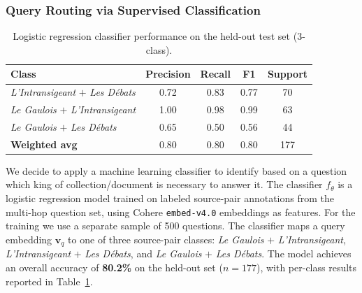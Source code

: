 \subsubsection{Query Routing via Supervised Classification}
\label{sec:classifier}

\begin{table}[htbp]
\centering
\small
\begin{tabular}{lcccc}
\toprule
\textbf{Class} & \textbf{Precision} & \textbf{Recall} & \textbf{F1} & \textbf{Support} \\
\midrule
\textit{L'Intransigeant} $+$ \textit{Les Débats}  & 0.72 & 0.83 & 0.77 & 70 \\
\textit{Le Gaulois} $+$ \textit{L'Intransigeant}  & 1.00 & 0.98 & 0.99 & 63 \\
\textit{Le Gaulois} $+$ \textit{Les Débats}        & 0.65 & 0.50 & 0.56 & 44 \\
\midrule
\textbf{Weighted avg}                              & 0.80 & 0.80 & 0.80 & 177 \\
\bottomrule
\end{tabular}
\caption{Logistic regression classifier performance on the held-out test set (3-class).}
\label{tab:clf-report}
\end{table}

We decide to apply a machine learning classifier to identify based on a question which king of collection/document is necessary to answer it.
The classifier $f_\theta$ is a logistic regression model trained on labeled
source-pair annotations from the multi-hop question set, using Cohere
\texttt{embed-v4.0} embeddings as features. For the training we use a separate sample of 500 questions. The classifier maps a query embedding $\mathbf{v}_q$ to one of three source-pair classes:
\textit{Le Gaulois} $+$ \textit{L'Intransigeant},
\textit{L'Intransigeant} $+$ \textit{Les Débats}, and
\textit{Le Gaulois} $+$ \textit{Les Débats}.
The model achieves an overall accuracy of \textbf{80.2\%} on the held-out set
($n{=}177$), with per-class results reported in Table~\ref{tab:clf-report}.


